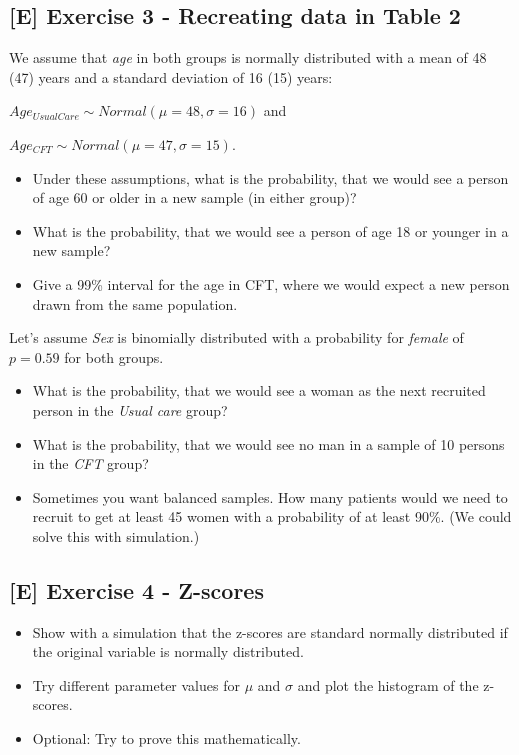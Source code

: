 \documentclass[
]{book}
\providecommand{\tightlist}{%
  \setlength{\itemsep}{0pt}\setlength{\parskip}{0pt}}
\begin{document}
\subsection{{[}E{]} Exercise 3 - Recreating data in Table 2}\label{exercise3_descriptive_stats}

We assume that \emph{age} in both groups is normally distributed with a mean of 48 (47) years
and a standard deviation of 16 (15) years:

\(Age_{UsualCare} \sim Normal(\mu = 48, \sigma = 16)\) and

\(Age_{CFT} \sim Normal(\mu = 47,\sigma = 15)\).

\begin{itemize}
\tightlist
\item
  Under these assumptions, what is the probability, that we would see a person of age 60 or older in a new sample (in either group)?
\item
  What is the probability, that we would see a person of age 18 or younger in a new sample?
\item
  Give a 99\% interval for the age in CFT,
  where we would expect a new person drawn from the same population.
\end{itemize}

Let's assume \emph{Sex} is binomially distributed with a probability for \emph{female} of \(p = 0.59\) for both groups.

\begin{itemize}
\tightlist
\item
  What is the probability, that we would see a woman as the next recruited person in the \emph{Usual care} group?
\item
  What is the probability, that we would see no man in a sample of 10 persons in the \emph{CFT} group?
\item
  Sometimes you want balanced samples. How many patients would we need to recruit to get at least 45 women with a probability of at least 90\%.
  (We could solve this with simulation.)
\end{itemize}

\subsection{{[}E{]} Exercise 4 - Z-scores}\label{exercise4_descriptive_stats}

\begin{itemize}
\tightlist
\item
  Show with a simulation that the z-scores are standard normally distributed if the original variable is normally distributed.
\item
  Try different parameter values for \(\mu\) and \(\sigma\) and plot the histogram of the z-scores.
\item
  Optional: Try to prove this mathematically.
\end{itemize}
\end{document}
